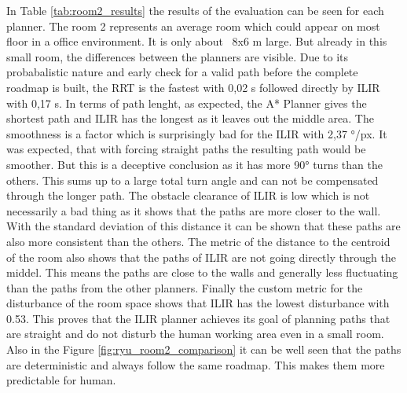 In Table \ref{tab:room2_results} the results of the evaluation can be seen for each planner. The room 2 represents an average room which could appear on most floor in a office environment. It is only about ~8x6 m large. But already in this small room, the differences between the planners are visible. Due to its probabalistic nature and early check for a valid path before the complete roadmap is built, the RRT is the fastest with 0,02 s followed directly by ILIR with 0,17 s. In terms of path lenght, as expected, the A* Planner gives the shortest path and ILIR has the longest as it leaves out the middle area. The smoothness is a factor which is surprisingly bad for the ILIR with 2,37 °/px. It was expected, that with forcing straight paths the resulting path would be smoother. But this is a deceptive conclusion as it has more 90° turns than the others. This sums up to a large total turn angle and can not be compensated through the longer path. The obstacle clearance of ILIR is low which is not necessarily a bad thing as it shows that the paths are more closer to the wall. With the standard deviation of this distance it can be shown that these paths are also more consistent than the others. The metric of the distance to the centroid of the room also shows that the paths of ILIR are not going directly through the middel. This means the paths are close to the walls and generally less fluctuating than the paths from the other planners. Finally the custom metric for the disturbance of the room space shows that ILIR has the lowest disturbance with 0.53. This proves that the ILIR planner achieves its goal of planning paths that are straight and do not disturb the human working area even in a small room. Also in the Figure \ref{fig:ryu_room2_comparison} it can be well seen that the paths are deterministic and always follow the same roadmap. This makes them more predictable for human.

